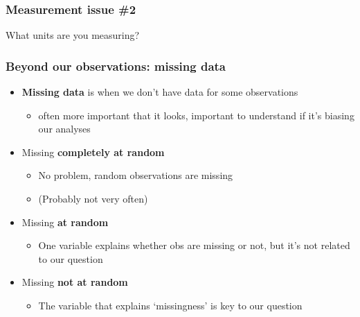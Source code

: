\documentclass[aspectratio=43]{beamer}
\begin{document}

\begin{frame}
\frametitle{Measurement issue \#2}
\centering

What units are you  measuring?

\end{frame}

\begin{frame}
\frametitle{Beyond our observations: missing data}
\centering

\begin{itemize}
  \item \textbf{Missing data} is when we don't have data for some observations
  \begin{itemize}
    \item often more important that it looks, important to understand if it's biasing our analyses
  \end{itemize}
  \item<2->[1.] Missing \textbf{completely at random}
  \begin{itemize}
    \item No problem, random observations are missing
    \item[] (Probably not very often)
  \end{itemize}
  \item<3->[2.] Missing \textbf{at random}
  \begin{itemize}
    \item One variable explains whether obs are missing or not, but it's not related to our question
  \end{itemize}
  \item<4->[3.] Missing \textbf{not at random}
  \begin{itemize}
    \item The variable that explains `missingness' is key to our question
  \end{itemize}
\end{itemize}

\end{frame}
\end{document}
